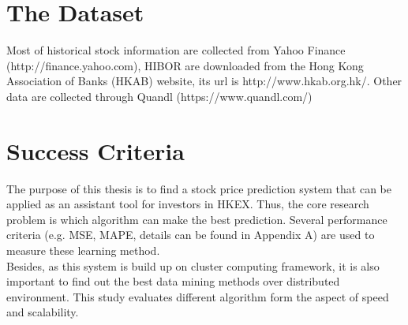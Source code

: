 \section{The Dataset}
Most of historical stock information are collected from Yahoo Finance (http://finance.yahoo.com), HIBOR are downloaded from the Hong Kong Association of Banks (HKAB) website, its url is http://www.hkab.org.hk/. Other data are collected through Quandl (https://www.quandl.com/)


\section{Success Criteria}
The purpose of this thesis is to find a stock price prediction system that can be applied as an assistant tool for investors in HKEX. Thus, the core research problem is which algorithm can make the best prediction. Several performance criteria (e.g. MSE, MAPE, details can be found in Appendix A) are used to measure these learning method.\\


Besides, as this system is build up on cluster computing framework, it is also important to find out the best data mining methods over distributed environment. This study evaluates different algorithm form the aspect of speed and scalability.


